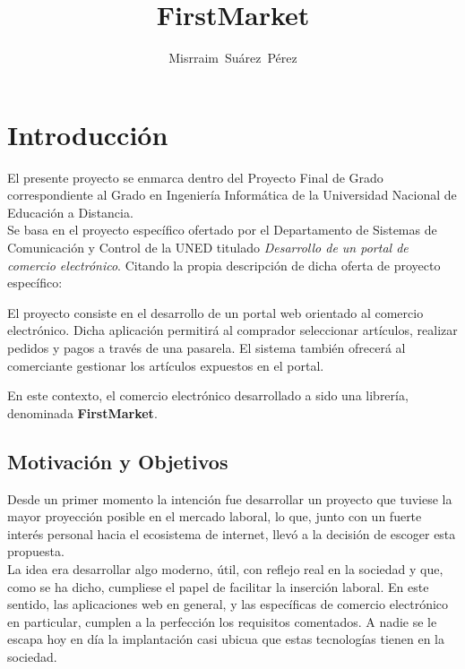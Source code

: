 \documentclass[a4paper]{report}
\author{Misrraim~Suárez~Pérez}
\title{FirstMarket}
\begin{document}
    \maketitle
    \tableofcontents

    \section{Introducción}
    El presente proyecto se enmarca dentro del Proyecto Final de Grado correspondiente al Grado en Ingeniería Informática de la Universidad Nacional de Educación a Distancia.
    \\
    
    Se basa en el proyecto específico ofertado por el Departamento de Sistemas de Comunicación y Control de la UNED titulado \emph{Desarrollo de un portal de comercio electrónico}. Citando la propia descripción de dicha oferta de proyecto específico:
    
    \begin{displayquote}
        El proyecto consiste en el desarrollo de un portal web orientado al comercio electrónico.
        Dicha aplicación permitirá al comprador seleccionar artículos, realizar pedidos y pagos a través de una pasarela.
        El sistema también ofrecerá al comerciante gestionar los artículos expuestos en el portal.
    \end{displayquote}

	En este contexto, el comercio electrónico desarrollado a sido una librería, denominada \textbf{FirstMarket}.

    \subsection{Motivación y Objetivos}
    Desde un primer momento la intención fue desarrollar un proyecto que tuviese la mayor proyección posible en el mercado laboral, lo que, junto con un fuerte interés personal hacia el ecosistema de internet, llevó a la decisión de escoger esta propuesta.
    \\
    
    La idea era desarrollar algo moderno, útil, con reflejo real en la sociedad y que, como se ha dicho, cumpliese el papel de facilitar la inserción laboral. En este sentido, las aplicaciones web en general, y las específicas de comercio electrónico en particular, cumplen a la perfección los requisitos comentados. A nadie se le escapa hoy en día la implantación casi ubicua que estas tecnologías tienen en la sociedad.
    \\
\end{document}
